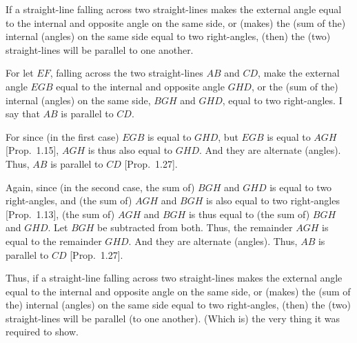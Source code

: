 \begin{Parallel}{}{}
{If a straight-line falling across two straight-lines makes the external angle equal
to the internal and opposite angle on the same side, or (makes) the (sum  of the) internal
(angles) on the same side equal
to two right-angles, (then) the (two) straight-lines will be parallel to
one another.

For let $EF$, falling across the two straight-lines $AB$ and $CD$, make the external
angle $EGB$ equal to the internal and opposite angle $GHD$, or the (sum of the) internal
(angles) on the same side, $BGH$ and $GHD$, equal to two right-angles.
I say that $AB$ is parallel to $CD$.

For since (in the first case) $EGB$ is equal to $GHD$, but $EGB$ is equal to $AGH$ [Prop.~1.15],
$AGH$ is thus also equal to $GHD$. And they are alternate (angles).
Thus, $AB$ is
 parallel to $CD$ [Prop.~1.27].

Again, since (in the second case, the sum of) $BGH$ and $GHD$ is equal to two right-angles,  and (the sum of) $AGH$ and
$BGH$ is also equal to two right-angles [Prop.~1.13], 
(the sum of) $AGH$ and $BGH$ is thus equal to (the sum of) $BGH$ and $GHD$. Let $BGH$ be
subtracted from both. Thus, the remainder $AGH$ is equal to the remainder
$GHD$. And they are alternate (angles). Thus, $AB$ is parallel
to $CD$ [Prop.~1.27].

\epsfysize=2.2in
\centerline{}

Thus, if a straight-line falling across  two straight-lines makes the external angle equal
to the internal and opposite angle on the same side, or (makes) the (sum of the) internal
(angles) on the same side equal
to two right-angles, (then) the (two) straight-lines will be parallel (to
one another). (Which is) the very thing it was required to show.}
\end{Parallel}

